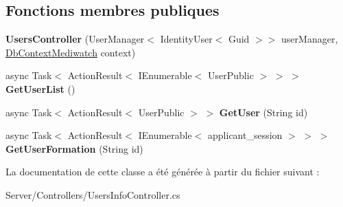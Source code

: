 \subsection*{Fonctions membres publiques}
\begin{DoxyCompactItemize}
\item 
\mbox{\label{class_mediwatch_1_1_server_1_1_controllers_1_1_users_controller_a7957039d9c7d38f0e6791f04e0dcde1e}} 
{\bfseries Users\+Controller} (User\+Manager$<$ Identity\+User$<$ Guid $>$$>$ user\+Manager, \hyperlink{class_server_1_1_db_context_mediwatch}{Db\+Context\+Mediwatch} context)
\item 
\mbox{\label{class_mediwatch_1_1_server_1_1_controllers_1_1_users_controller_a5b525adc63d36869bde5021b82480228}} 
async Task$<$ Action\+Result$<$ I\+Enumerable$<$ User\+Public $>$ $>$ $>$ {\bfseries Get\+User\+List} ()
\item 
\mbox{\label{class_mediwatch_1_1_server_1_1_controllers_1_1_users_controller_a27103389ca1c6c33d21a3dc3212d7b08}} 
async Task$<$ Action\+Result$<$ User\+Public $>$ $>$ {\bfseries Get\+User} (String id)
\item 
\mbox{\label{class_mediwatch_1_1_server_1_1_controllers_1_1_users_controller_a3da0476c39418727064b44af9e007010}} 
async Task$<$ Action\+Result$<$ I\+Enumerable$<$ applicant\+\_\+session $>$ $>$ $>$ {\bfseries Get\+User\+Formation} (String id)
\end{DoxyCompactItemize}


La documentation de cette classe a été générée à partir du fichier suivant \+:\begin{DoxyCompactItemize}
\item 
Server/\+Controllers/Users\+Info\+Controller.\+cs\end{DoxyCompactItemize}

